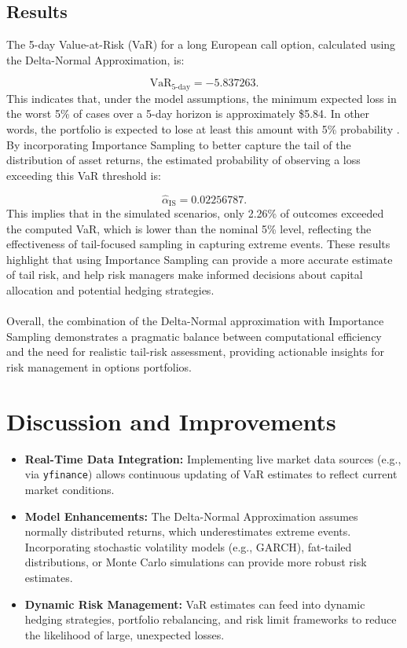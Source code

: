 \documentclass[11pt,a4paper]{article}
\begin{document}
\subsection{Results}
The 5-day Value-at-Risk (VaR) for a long European call option, calculated using the Delta-Normal Approximation, is:

\[
\text{VaR}_{5\text{-day}} = -5.837263.
\]
This indicates that, under the model assumptions, the minimum expected loss in the worst 5\% of cases over a 5-day horizon is approximately \$5.84. In other words, the portfolio is expected to lose at least this amount with 5\% probability \cite{Artzner1999}.\\  
By incorporating Importance Sampling to better capture the tail of the distribution of asset returns, the estimated probability of observing a loss exceeding this VaR threshold is:

\[
\hat{\alpha}_{\text{IS}} = 0.02256787.
\]
This implies that in the simulated scenarios, only 2.26\% of outcomes exceeded the computed VaR, which is lower than the nominal 5\% level, reflecting the effectiveness of tail-focused sampling in capturing extreme events. These results highlight that using Importance Sampling can provide a more accurate estimate of tail risk, and help risk managers make informed decisions about capital allocation and potential hedging strategies.\\
\\
Overall, the combination of the Delta-Normal approximation with Importance Sampling demonstrates a pragmatic balance between computational efficiency and the need for realistic tail-risk assessment, providing actionable insights for risk management in options portfolios.


\section{Discussion and Improvements}
\begin{itemize}
    \item \textbf{Real-Time Data Integration:} Implementing live market data sources (e.g., via \texttt{yfinance}) allows continuous updating of VaR estimates to reflect current market conditions.
    \item \textbf{Model Enhancements:} The Delta-Normal Approximation assumes normally distributed returns, which underestimates extreme events. Incorporating stochastic volatility models (e.g., GARCH), fat-tailed distributions, or Monte Carlo simulations can provide more robust risk estimates.
    \item \textbf{Dynamic Risk Management:} VaR estimates can feed into dynamic hedging strategies, portfolio rebalancing, and risk limit frameworks to reduce the likelihood of large, unexpected losses.
\end{itemize}
\end{document}
